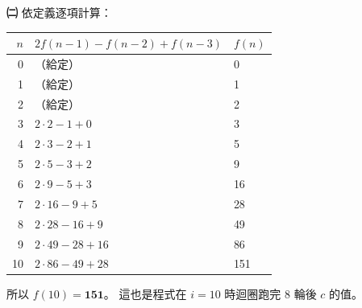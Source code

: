 \begin{pastsoln}
\textbf{㈡} 依定義逐項計算：
\begin{center}
\small
\begin{tabular}{rll}
\toprule
$n$ & $2f(n-1) - f(n-2) + f(n-3)$ & $f(n)$ \\
\midrule
0 & （給定） & 0 \\
1 & （給定） & 1 \\
2 & （給定） & 2 \\
3 & $2 \cdot 2 - 1 + 0$ & 3 \\
4 & $2 \cdot 3 - 2 + 1$ & 5 \\
5 & $2 \cdot 5 - 3 + 2$ & 9 \\
6 & $2 \cdot 9 - 5 + 3$ & 16 \\
7 & $2 \cdot 16 - 9 + 5$ & 28 \\
8 & $2 \cdot 28 - 16 + 9$ & 49 \\
9 & $2 \cdot 49 - 28 + 16$ & 86 \\
10 & $2 \cdot 86 - 49 + 28$ & 151 \\
\bottomrule
\end{tabular}
\end{center}
所以 $f(10) = \mathbf{151}$。 這也是程式在 $i = 10$ 時迴圈跑完 $8$ 輪後 $c$ 的值。
\end{pastsoln}
